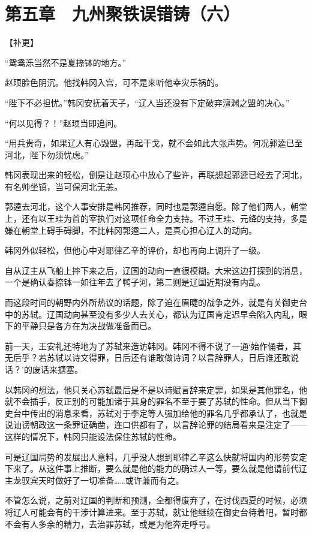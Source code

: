 \section{第五章　九州聚铁误错铸（六）}

【补更】

“鸳鸯泺当然不是夏捺钵的地方。”

赵顼脸色阴沉。他找韩冈入宫，可不是来听他幸灾乐祸的。

“陛下不必担忧。”韩冈安抚着天子，“辽人当还没有下定破弃澶渊之盟的决心。”

“何以见得？！”赵顼当即追问。

“用兵贵奇，如果辽人有心毁盟，再起干戈，就不会如此大张声势。何况郭逵已至河北，陛下勿须忧虑。”

韩冈表现出来的轻松，倒是让赵顼心中放心了些许，再联想起郭逵已经去了河北，有名帅坐镇，当可保河北无恙。

郭逵去河北，这个人事安排是韩冈推荐，同时也是郭逵自愿。除了他们两人，朝堂上，还有以王珪为首的宰执们对这项任命全力支持。不过王珪、元绛的支持，多是嫌在朝堂上碍手碍脚，不比韩冈郭逵二人，是真心担心辽人的动向。

韩冈外似轻松，但他心中对耶律乙辛的评价，却也再向上调升了一级。

自从辽主从飞船上摔下来之后，辽国的动向一直很模糊。大宋这边打探到的消息，一个是确认春捺钵一如往年去了鸭子河，第二则是辽国近期没有内乱。

而这段时间的朝野内外所热议的话题，除了迫在眉睫的战争之外，就是有关御史台中的苏轼。辽国动向甚至没有多少人去关心，都认为辽国肯定迟早会陷入内乱，眼下的平静只是各方在为决战做准备而已。

前一天，王安礼还特地为了苏轼来造访韩冈。韩冈不得不说了一通‘始作俑者，其无后乎？若苏轼以诗文得罪，日后还有谁敢做诗词？以言辞罪人，日后谁还敢说话？’的废话来搪塞。

以韩冈的想法，他只关心苏轼最后是不是以诗赋言辞来定罪，如果是其他罪名，他就不会插手，反正别的可能加诸于其身的罪名不至于要了苏轼的性命。但从当下御史台中传出的消息来看，苏轼对于李定等人强加给他的罪名几乎都承认了，也就是说讪谤朝政这一条罪证确凿，连口供都有了，以言辞论罪的结局看来是注定了——这样的情况下，韩冈只能设法保住苏轼的性命。

可是辽国局势的发展出人意料，几乎没人想到耶律乙辛这么快就将国内的形势安定下来了。从这件事上推断，要么就是他的能力的确过人一等，要么就是他请前代辽主龙驭宾天时做好了一切准备……或许兼而有之。

不管怎么说，之前对辽国的判断和预测，全都得废弃了，在讨伐西夏的时候，必须将辽人可能会有的干涉计算进来。至于苏轼，就让他继续在御史台待着吧，暂时都不会有人多余的精力，去治罪苏轼，或是为他奔走呼号。

